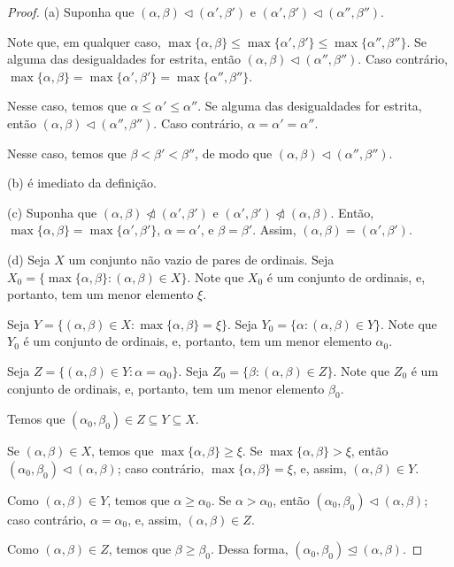 \begin{proof}
    (a) Suponha que $(\alpha, \beta) \triangleleft (\alpha', \beta')$ e $(\alpha', \beta') \triangleleft (\alpha'', \beta'')$.
    
    Note que, em qualquer caso, $\max\{\alpha, \beta\} \leq \max\{\alpha', \beta'\} \leq \max\{\alpha'', \beta''\}$.
    Se alguma das desigualdades for estrita, então $(\alpha, \beta) \triangleleft (\alpha'', \beta'')$.
    Caso contrário, $\max\{\alpha, \beta\} = \max\{\alpha', \beta'\} = \max\{\alpha'', \beta''\}$.
    
    Nesse caso, temos que $\alpha \leq \alpha' \leq \alpha''$.
    Se alguma das desigualdades for estrita, então $(\alpha, \beta) \triangleleft (\alpha'', \beta'')$.
    Caso contrário, $\alpha = \alpha' = \alpha''$.

    Nesse caso, temos que $\beta < \beta' < \beta''$, de modo que $(\alpha, \beta) \triangleleft (\alpha'', \beta'')$.

    (b) é imediato da definição.

    (c) Suponha que $(\alpha, \beta) \ntriangleleft (\alpha', \beta')$ e $(\alpha', \beta') \ntriangleleft (\alpha, \beta)$.
    Então, $\max\{\alpha, \beta\} = \max\{\alpha', \beta'\}$, $\alpha = \alpha'$, e $\beta = \beta'$.
    Assim, $(\alpha, \beta) = (\alpha', \beta')$.

    (d) Seja $X$ um conjunto não vazio de pares de ordinais.
    Seja $X_0=\{\max\{\alpha, \beta\} : (\alpha, \beta)\in X\}$.
    Note que $X_0$ é um conjunto de ordinais, e, portanto, tem um menor elemento $\xi$.

    Seja $Y=\{(\alpha, \beta)\in X : \max\{\alpha, \beta\} = \xi\}$.
    Seja $Y_0=\{\alpha : (\alpha, \beta)\in Y\}$.
    Note que $Y_0$ é um conjunto de ordinais, e, portanto, tem um menor elemento $\alpha_0$.

    Seja $Z=\{(\alpha, \beta)\in Y : \alpha = \alpha_0\}$.
    Seja $Z_0=\{\beta : (\alpha, \beta)\in Z\}$.
    Note que $Z_0$ é um conjunto de ordinais, e, portanto, tem um menor elemento $\beta_0$.

    Temos que $(\alpha_0, \beta_0)\in Z \subseteq Y \subseteq X$.

    Se $(\alpha, \beta)\in X$, temos que $\max\{\alpha, \beta\} \geq \xi$.
    Se $\max\{\alpha, \beta\} > \xi$, então $(\alpha_0, \beta_0) \triangleleft (\alpha, \beta)$;
    caso contrário, $\max\{\alpha, \beta\} = \xi$, e, assim, $(\alpha, \beta)\in Y$.

    Como $(\alpha, \beta)\in Y$, temos que $\alpha \geq \alpha_0$.
    Se $\alpha > \alpha_0$, então $(\alpha_0, \beta_0) \triangleleft (\alpha, \beta)$;
    caso contrário, $\alpha = \alpha_0$, e, assim, $(\alpha, \beta)\in Z$.

    Como $(\alpha, \beta)\in Z$, temos que $\beta \geq \beta_0$.
    Dessa forma, $(\alpha_0, \beta_0) \trianglelefteq (\alpha, \beta)$.
\end{proof}

